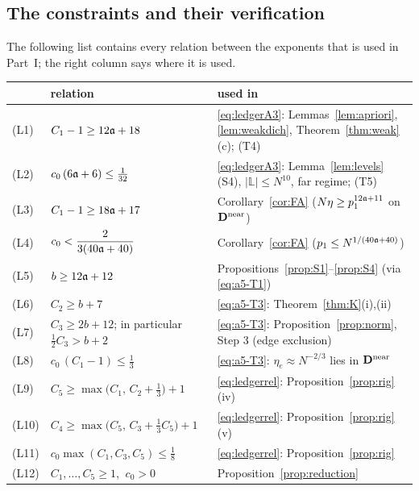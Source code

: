 \subsection{The constraints and their verification}\label{app:constraints}
The following list contains every relation between the exponents that is used in Part~I; the right column says where it is used.
\begin{center}
\renewcommand{\arraystretch}{1.15}\small
\begin{tabular}{|l|p{}|p{}|}
\hline
 & relation & used in\\\hline
(L1) & $C_1-1\ge12\mathfrak{a}+18$ & \eqref{eq:ledgerA3}: Lemmas~\ref{lem:apriori}, \ref{lem:weakdich}, Theorem~\ref{thm:weak}(c); (T4)\\
(L2) & $c_0\,(6\mathfrak{a}+6)\le\frac1{32}$ & \eqref{eq:ledgerA3}: Lemma~\ref{lem:levels}(S4), $|\mathbb L|\le N^{10}$, far regime; (T5)\\
(L3) & $C_1-1\ge18\mathfrak{a}+17$ & Corollary~\ref{cor:FA} ($N\eta\ge p_1^{12\mathfrak{a}+11}$ on $\mathbf{D}^{\rm near}$)\\
(L4) & $c_0<\dfrac{2}{3(40\mathfrak{a}+40)}$ & Corollary~\ref{cor:FA} ($p_1\le N^{1/(40\mathfrak{a}+40)}$)\\
(L5) & $b\ge12\mathfrak{a}+12$ & Propositions~\ref{prop:S1}--\ref{prop:S4} (via \eqref{eq:a5-T1})\\
(L6) & $C_2\ge b+7$ & \eqref{eq:a5-T3}: Theorem~\ref{thm:K}(i),(ii)\\
(L7) & $C_3\ge2b+12$; in particular $\frac12C_3>b+2$ & \eqref{eq:a5-T3}: Proposition~\ref{prop:norm}, Step 3 (edge exclusion)\\
(L8) & $c_0\,(C_1-1)\le\frac13$ & \eqref{eq:a5-T3}: $\eta_e\approx N^{-2/3}$ lies in $\mathbf{D}^{\rm near}$\\
(L9) & $C_5\ge\max\big(C_1,\,C_2+\frac13\big)+1$ & \eqref{eq:ledgerrel}: Proposition~\ref{prop:rig}(iv)\\
(L10) & $C_4\ge\max\big(C_5,\,C_3+\frac13C_5\big)+1$ & \eqref{eq:ledgerrel}: Proposition~\ref{prop:rig}(v)\\
(L11) & $c_0\max(C_1,C_3,C_5)\le\frac18$ & \eqref{eq:ledgerrel}: Proposition~\ref{prop:rig}\\
(L12) & $C_1,\dots,C_5\ge1$, $\ c_0>0$ & Proposition~\ref{prop:reduction}\\\hline
\end{tabular}
\end{center}

